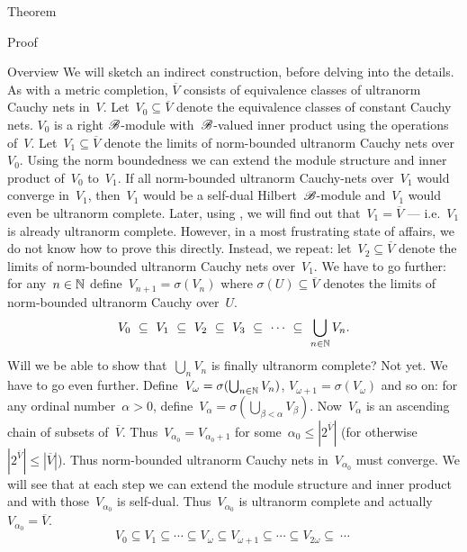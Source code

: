\begin{parsec}
\begin{point}{Theorem}
\begin{point}{Proof}
\begin{point}{Overview}
We will sketch an indirect construction,
    before delving into the details.
As with a metric completion,
    $\overline{V}$ consists of equivalence classes of ultranorm
        Cauchy nets in~$V$.
Let~$V_0\subseteq \overline{V}$
    denote the equivalence classes of constant Cauchy nets.
$V_0$ is a right $\mathscr{B}$-module with~$\mathscr{B}$-valued inner product
    using the operations of~$V$.
Let~$V_1\subseteq \overline{V}$ denote
    the limits of norm-bounded ultranorm Cauchy nets over~$V_0$.
Using the norm boundedness we can extend
    the module structure and inner product of~$V_0$ to~$V_1$.
If all norm-bounded ultranorm Cauchy-nets over~$V_1$ would
    converge in~$V_1$,
    then~$V_1$ would be a self-dual Hilbert~$\mathscr{B}$-module
    and~$V_1$ would even be ultranorm complete.
Later, using ,
    we will find out that~$V_1 = \overline{V}$ ---
    i.e.~$V_1$ is already ultranorm complete.
However, in a most frustrating state of affairs,
    we do not know how to prove this directly.
Instead, we repeat: let~$V_2 \subseteq \overline{V}$
    denote the limits of norm-bounded ultranorm Cauchy nets over~$V_1$.
We have to go further:
    for any~$n \in \mathbb{N}$
    define~$V_{n+1} = \sigma(V_n)$
    where $\sigma(U)\subseteq \overline{V}$
    denotes the limits of norm-bounded ultranorm Cauchy over~$U$.
\begin{equation*}
   V_0 \ \subseteq \ V_1 \ \subseteq\  V_2\  \subseteq\  V_3 \ \subseteq \ \cdots\ \subseteq \ \bigcup_{n \in \N} V_n.
\end{equation*}
Will we be able to show that~$\bigcup_n V_n$ is finally ultranorm complete?
Not yet.
We have to go even further.
Define~$V_\omega = \sigma(\bigcup_{n \in \mathbb{N}} V_n)$,
$V_{\omega+1} = \sigma(V_\omega)$
and so on:
for any ordinal number~$\alpha > 0$,
    define~$V_\alpha = \sigma(\bigcup_{\beta < \alpha} V_\beta)$.
Now~$V_\alpha$
    is an ascending chain of subsets of~$\overline{V}$.
    Thus~$V_{\alpha_0} = V_{{\alpha_0}+1}$
for some~$\alpha_0 \leq |2^{\overline{V}}|$
(for otherwise~$|2^{\overline{V}}| \leq |\overline{V}|$).
Thus norm-bounded ultranorm Cauchy nets in~$V_{\alpha_0}$
    must converge.
We will see that at each step we can extend the module structure
    and inner product and with those~$V_{\alpha_0}$ is self-dual.
    Thus~$V_{\alpha_0}$ is ultranorm complete
    and actually~$V_{\alpha_0} = \overline{V}$.
\begin{equation*}
   V_0 \subseteq V_1 \subseteq \cdots \subseteq V_\omega \subseteq
   V_{\omega+1} \subseteq \cdots \subseteq V_{2\omega} \subseteq
       \ \cdots\ 

\end{equation*}
\end{point}
\end{point}
\end{point}
\end{parsec}
